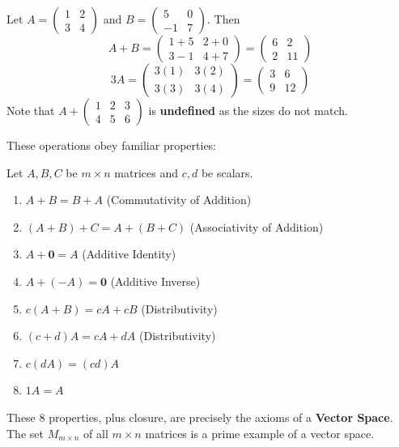 \begin{example}
Let $A = \begin{pmatrix} 1 & 2 \\ 3 & 4 \end{pmatrix}$ and $B = \begin{pmatrix} 5 & 0 \\ -1 & 7 \end{pmatrix}$.
Then
\[ A+B = \begin{pmatrix} 1+5 & 2+0 \\ 3-1 & 4+7 \end{pmatrix} = \begin{pmatrix} 6 & 2 \\ 2 & 11 \end{pmatrix} \]
\[ 3A = \begin{pmatrix} 3(1) & 3(2) \\ 3(3) & 3(4) \end{pmatrix} = \begin{pmatrix} 3 & 6 \\ 9 & 12 \end{pmatrix} \]
Note that $A + \begin{pmatrix} 1 & 2 & 3 \\ 4 & 5 & 6 \end{pmatrix}$ is \textbf{undefined} as the sizes do not match.
\end{example}

These operations obey familiar properties:
\begin{property}
Let $A, B, C$ be $m \times n$ matrices and $c, d$ be scalars.
\begin{enumerate}
    \item $A+B = B+A$ (Commutativity of Addition)
    \item $(A+B)+C = A+(B+C)$ (Associativity of Addition)
    \item $A + \mathbf{0} = A$ (Additive Identity)
    \item $A + (-A) = \mathbf{0}$ (Additive Inverse)
    \item $c(A+B) = cA + cB$ (Distributivity)
    \item $(c+d)A = cA + dA$ (Distributivity)
    \item $c(dA) = (cd)A$
    \item $1A = A$
\end{enumerate}
\end{property}
\begin{remark}
These 8 properties, plus closure, are precisely the axioms of a \textbf{Vector Space}. The set $M_{m \times n}$ of all $m \times n$ matrices is a prime example of a vector space.
\end{remark}


